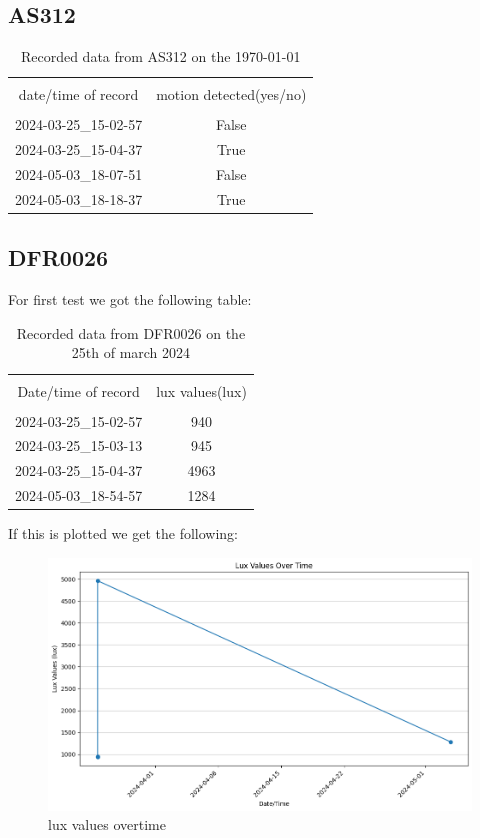 \subsection{AS312}
\begin{table}[h!]
    \centering
    \begin{tabular}{|c|c|}
        \hline\\
        date/time of record & motion detected(yes/no)\\
        \hline \hline\\
        2024-03-25_15-02-57&False \\
        2024-03-25_15-04-37&True\\
        2024-05-03_18-07-51&False\\
        2024-05-03_18-18-37&True\\
        \hline
    \end{tabular}
    \caption{Recorded data from  AS312 on the \today}
    \label{Recorded data from  AS312 on the \today}
\end{table}
\subsection{DFR0026}
For first test we got  the following table: 
\begin{table}[h!]
    \centering
    \begin{tabular}{|c|c|}
        \hline\\
        Date/time of record & lux values(lux)\\
        \hline \hline\\
        2024-03-25_15-02-57&940\\
        2024-03-25_15-03-13&945\\
        2024-03-25_15-04-37&4963\\
        2024-05-03_18-54-57&1284
        \hline
    \end{tabular}
    \caption{Recorded data from DFR0026 on the 25th of march 2024}
    \label{Recorded data from DFR0026 on the 25th of march 2024}
\end{table}
If this is plotted we get the following:
\begin{figure}[h!]
    \centering
    \includegraphics[width=0.5\linewidth]{Images/lux_values_overtime.png}
    \caption{lux values overtime}
    \label{lux values overtime}
\end{figure}
\newpage
